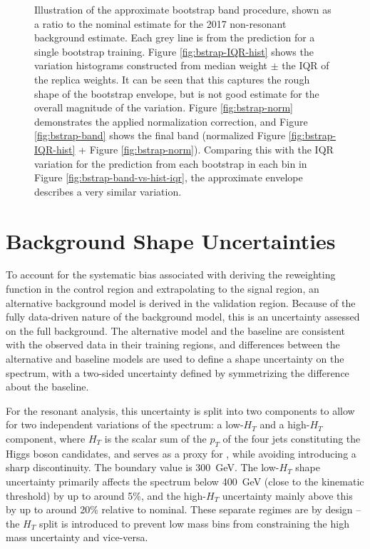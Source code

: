\begin{figure}[ht]
	\caption{Illustration of the approximate bootstrap band procedure, shown as a ratio to the nominal estimate 
	for the 2017 non-resonant background estimate. Each grey line is from the \mhh prediction for a 
	single bootstrap training. Figure \ref{fig:bstrap-IQR-hist} shows 
	the variation histograms constructed from median weight $\pm$ the IQR of the replica weights. It can be seen 
	that this captures the rough shape of the bootstrap envelope, but is not good estimate for the overall magnitude
	of the variation. Figure \ref{fig:bstrap-norm} demonstrates the applied normalization correction, and Figure 
	\ref{fig:bstrap-band} shows the final band (normalized Figure \ref{fig:bstrap-IQR-hist} + 
	Figure \ref{fig:bstrap-norm}). Comparing this with the IQR variation for the prediction from each bootstrap 
	in each bin in Figure \ref{fig:bstrap-band-vs-hist-iqr}, the approximate envelope describes a very similar variation.}
	\label{fig:bootstrap-breakdown}
\end{figure}

\FloatBarrier
\section{Background Shape Uncertainties}
To account for the systematic bias associated with deriving the reweighting function
in the control region and extrapolating to the signal region, an alternative background
model is derived in the validation region. Because of the fully data-driven nature of the 
background model, this is an uncertainty assessed on the full background. The alternative model 
and the baseline are consistent with the observed data in their training regions, and 
differences between the alternative and baseline models are used to define a shape uncertainty on the \mhh
spectrum, with a two-sided uncertainty defined by symmetrizing the difference about
the baseline.

For the resonant analysis, this uncertainty is split into two components to allow for two 
independent variations of the \mhh spectrum: a low-$H_{T}$ and a high-$H_{T}$ component,
where $H_{T}$ is the scalar sum of the $p_{T}$ of the four jets constituting the
Higgs boson candidates, and serves as a proxy for \mhh, while avoiding
introducing a sharp discontinuity. The boundary value is \SI{300}{\GeV}. The
low-$H_{T}$ shape uncertainty primarily affects the \mhh spectrum below
\SI{400}{\GeV} (close to the kinematic threshold) by up to around 5\%, and the
high-$H_{T}$ uncertainty mainly \mhh above this by up to around 20\% relative to
nominal. These separate \mhh regimes are by design -- the $H_{T}$ split is 
introduced to prevent low mass bins from constraining the high mass uncertainty 
and vice-versa. 

